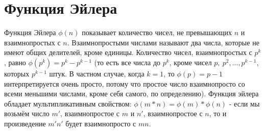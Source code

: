 \documentclass[12pt,a4paper]{scrartcl}
\begin{document}
	
\section{Функция Эйлера}

Функция Эйлера $\phi(n)$ показывает количество чисел, не превышающих $n$ и взаимнопростых с $n$. Взаимнопростыми числами называют два числа, которые не имеют общих делителей, кроме единицы. Количество чисел, взаимнопростых с $p^k$, равно $\phi(p^k)=p^k-p^{k-1}$ (то есть все числа до $p^k$, кроме чисел $p,\ p^2,...,p^{k-1}$, которых $p^{k-1}$ штук. В частном случае, когда $k=1$, то $\phi(p)=p-1$ интерпретируется очень просто, потому что простое число взаимнопросто со всеми меньшими числами, кроме себя самого, по определению). Функция эйлера обладает мультипликативным свойством: $\phi(m*n)=\phi(m)*\phi(n)$ - если мы возьмём число $m'$, взаимнопростое с $m$ и $n'$, взаимнопростое с $n$, то и произведение $m'n'$ будет взаимнопросто с $mn$.

	
\end{document}
